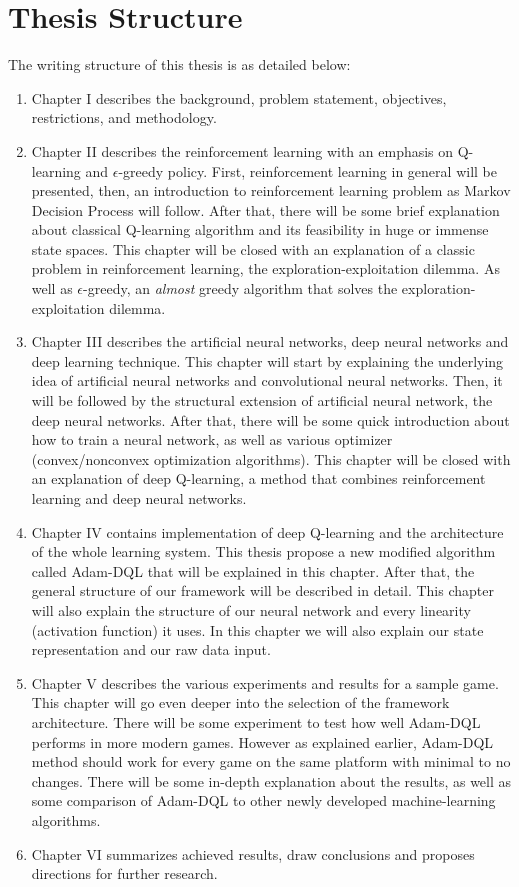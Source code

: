 	\section{Thesis Structure}
	The writing structure of this thesis is as detailed below:
	\begin{enumerate}
	    \item Chapter I describes the background, problem statement, objectives, restrictions, and methodology. 
	    \item Chapter II describes the reinforcement learning with an emphasis on Q-learning and $\epsilon$-greedy policy. First, reinforcement learning in general will be presented, then, an introduction to reinforcement learning problem as Markov Decision Process will follow. After that, there will be some brief explanation about classical Q-learning algorithm and its feasibility in huge or immense state spaces. This chapter will be closed with an explanation of a classic problem in reinforcement learning, the exploration-exploitation dilemma. As well as $\epsilon$-greedy, an \textit{almost} greedy algorithm that solves the exploration-exploitation dilemma.
	    \item Chapter III describes the artificial neural networks, deep neural networks and deep learning technique. This chapter will start by explaining the underlying idea of artificial neural networks and convolutional neural networks. Then, it will be followed by the structural extension of artificial neural network, the deep neural networks. After that, there will be some quick introduction about how to train a neural network, as well as various optimizer (convex/nonconvex optimization algorithms). This chapter will be closed with an explanation of deep Q-learning, a method that combines reinforcement learning and deep neural networks.
	    \item Chapter IV contains implementation of deep Q-learning and the architecture of the whole learning system. This thesis propose a new modified algorithm called Adam-DQL that will be explained in this chapter. After that, the general structure of our framework will be described in detail. This chapter will also explain the structure of our neural network and every linearity (activation function) it uses. In this chapter we will also explain our state representation and our raw data input. 
	    \item Chapter V describes the various experiments and results for a sample game. This chapter will go even deeper into the selection of the framework architecture. There will be some experiment to test how well Adam-DQL performs in more modern games. However as explained earlier, Adam-DQL method should work for every game on the same platform with minimal to no changes. There will be some in-depth explanation about the results, as well as some comparison of Adam-DQL to other newly developed machine-learning algorithms.
	    \item Chapter VI summarizes achieved results, draw conclusions and proposes directions for further research.
	\end{enumerate}